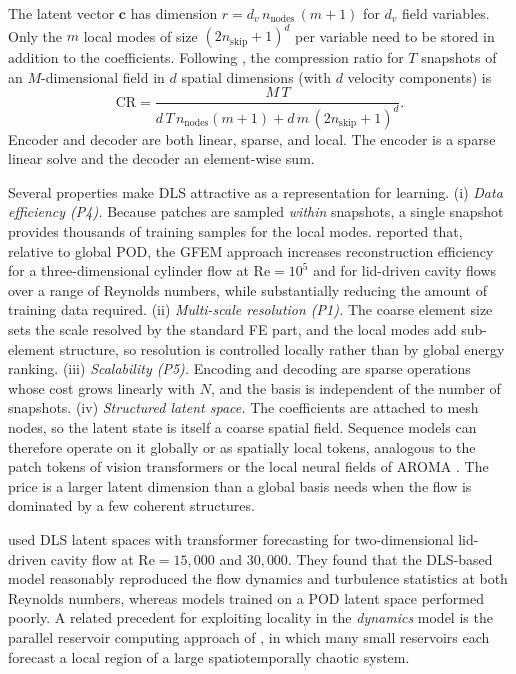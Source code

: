 The latent vector $\bm{c}$ has dimension $r=d_v\,n_{\mathrm{nodes}}\,(m+1)$
for $d_v$ field variables. Only the $m$ local modes of size
$(2n_{\mathrm{skip}}+1)^{d}$ per variable need to be stored in addition to the
coefficients. Following \textcite{deshmukh2020dls}, the compression ratio for
$T$ snapshots of an $M$-dimensional field in $d$ spatial dimensions (with $d$
velocity components) is
\begin{equation}
  \mathrm{CR}=\frac{M\,T}{d\,T\,n_{\mathrm{nodes}}(m+1)+d\,m\,(2n_{\mathrm{skip}}+1)^{d}}.
\end{equation}
Encoder and decoder are both linear, sparse, and local. The encoder is a
sparse linear solve and the decoder an element-wise sum.

Several properties make DLS attractive as a representation for learning.
(i) \emph{Data efficiency (P4).} Because patches are sampled \emph{within}
snapshots, a single snapshot provides thousands of training samples for the
local modes. \textcite{deshmukh2020dls} reported that, relative to global POD,
the GFEM approach increases reconstruction efficiency for a three-dimensional
cylinder flow at $\mathrm{Re}=10^{5}$ and for lid-driven cavity flows over a
range of Reynolds numbers, while substantially reducing the amount of training
data required. (ii) \emph{Multi-scale resolution (P1).} The coarse element size
sets the scale resolved by the standard FE part, and the local modes add
sub-element structure, so resolution is controlled locally rather than by
global energy ranking. (iii) \emph{Scalability (P5).} Encoding and decoding
are sparse operations whose cost grows linearly with $N$, and the basis is
independent of the number of snapshots. (iv) \emph{Structured latent space.}
The coefficients are attached to mesh nodes, so the latent state is itself a
coarse spatial field. Sequence models can therefore operate on it globally or
as spatially local tokens, analogous to the patch tokens of vision transformers
\parencite{dosovitskiy2021vit} or the local neural fields of AROMA
\parencite{serrano2024aroma}. The price is a larger latent dimension than a
global basis needs when the flow is dominated by a few coherent structures.

\textcite{morton2026scitech} used DLS latent spaces with transformer forecasting
for two-dimensional lid-driven cavity flow at $\mathrm{Re}=15{,}000$ and
$30{,}000$. They found that the DLS-based model reasonably reproduced the flow
dynamics and turbulence statistics at both Reynolds numbers, whereas models
trained on a POD latent space performed poorly. A related precedent for
exploiting locality in the \emph{dynamics} model is the parallel reservoir
computing approach of \textcite{pathak2018reservoir}, in which many small
reservoirs each forecast a local region of a large spatiotemporally chaotic
system.

